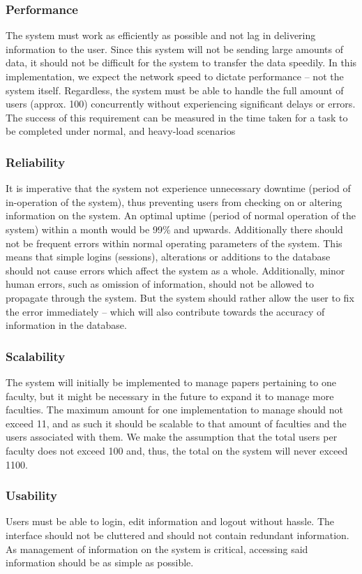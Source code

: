 \documentclass[a4paper,12pt]{article}
\begin{document}
\subsubsection{Performance}
The system must work as efficiently as possible and not lag in delivering information to the user. Since this system will not be sending large amounts of data, it should not be difficult for the system to transfer the data speedily. In this implementation, we expect the network speed to dictate performance – not the system itself. Regardless, the system must be able to handle the full amount of users (approx. 100) concurrently without experiencing significant delays or errors. The success of this requirement can be measured in the time taken for a task to be completed under normal, and heavy-load scenarios

\subsubsection{Reliability}
It is imperative that the system not experience unnecessary downtime (period of in-operation of the system), thus preventing users from checking on or altering information on the system. An optimal uptime (period of normal operation of the system) within a month would be 99\% and upwards. Additionally there should not be frequent errors within normal operating parameters of the system. This means that simple logins (sessions), alterations or additions to the database should not cause errors which affect the system as a whole. Additionally, minor human errors, such as omission of information, should not be allowed to propagate through the system. But the system should rather allow the user to fix the error immediately – which will also contribute towards the accuracy of information in the database.

\subsubsection{Scalability}
The system will initially be implemented to manage papers pertaining to one faculty, but it might be necessary in the future to expand it to manage more faculties. The maximum amount for one implementation to manage should not exceed 11, and as such it should be scalable to that amount of faculties and the users associated with them. We make the assumption that the total users per faculty does not exceed 100 and, thus, the total on the system will never exceed 1100.

\subsubsection{Usability} 
Users must be able to login, edit information and logout without hassle. The interface should not be cluttered and should not contain redundant information. As management of information on the system is critical, accessing said information should be as simple as possible.
\end{document}
